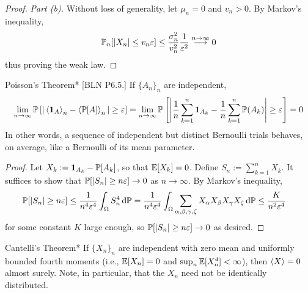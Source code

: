 \begin{proof}
    \emph{Part (b).} Without loss of generality, let \(\mu_n = 0\) and \(v_n > 0\). By Markov's inequality, 
    \[
        \mathbb{P}_n[|X_n| \leq v_n \varepsilon]
        \leq \frac{\sigma_n^2}{v_n^2} \frac{1}{\varepsilon^2} \stackrel{n \to \infty}{\longrightarrow} 0
    \]
    thus proving the weak law. 
\end{proof}


\begin{problem}{Poisson's Theorem}*
    [BLN P6.5.] If \(\{A_n\}_n\) are independent,
    \[
        \lim_{n \to \infty} \bb{P}\left[ |\ev{\mb{1}_A}_n - \ev{\bb{P}[A]}_n | \geq \varepsilon \right]
        = \lim_{n \to \infty} \bb{P}\left[ \left| \frac{1}{n} \sum_{k=1}^n \mb{1}_{A_k} - \frac{1}{n} \sum_{k=1}^n \bb{P}(A_k) \right| \geq \varepsilon \right] 
        = 0
    \]
    In other words, a sequence of independent but distinct Bernoulli trials behaves, on average, like a Bernoulli of its mean parameter.
\end{problem}

\begin{proof}
    Let \(X_k := \mathbf{1}_{A_k} - \mathbb{P}[A_k]\), so that \(\mathbb{E}[X_k] = 0\). Define \(S_n := \sum_{k=1}^n X_k\). It suffices to show that \(\mathbb{P}[|S_n| \geq n \varepsilon] \to 0\) as \(n \to \infty\). By Markov's inequality, 
    \begin{align*}
        \mathbb{P}[|S_n| \geq n \varepsilon] 
        &\leq \frac{1}{n^4 \varepsilon^4} \int_{\Omega} S_n^4 \, \mathrm{d}\mathbb{P}
        = \frac{1}{n^4 \varepsilon^4} \int_\Omega \sum_{\alpha,\beta,\gamma,\zeta} X_\alpha X_\beta X_\gamma X_\zeta \, \mathrm{d}\mathbb{P}
        \leq \frac{K}{n^2 \varepsilon^4} 
    \end{align*}
    for some constant \(K\) large enough, so \(\mathbb{P}[|S_n| \geq n \varepsilon] \to 0\) as desired. 
\end{proof}


\begin{problem}{Cantelli's Theorem}*
    If \(\{X_n\}_n\) are independent with zero mean and uniformly bounded fourth moments (i.e., \(\mathbb{E}[X_n] = 0\) and \(\sup_n \mathbb{E}[X_n^4] < \infty\)), then \(\ev{X} = 0\) almost surely. Note, in particular, that the \(X_n\) need not be identically distributed. 
\end{problem}

